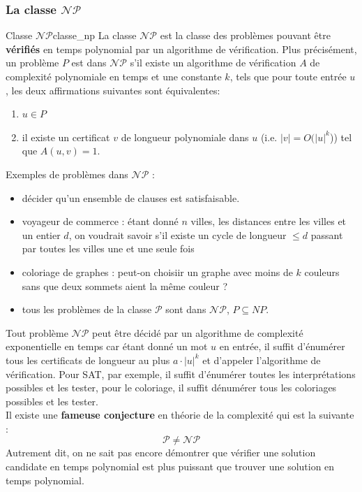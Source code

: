 \subsubsection{La classe $\mathcal{NP}$}
\label{sub:la_classe_np}
\begin{definition}{Classe $\mathcal{NP}$}{classe_np}
    La classe $\mathcal{NP}$ est la classe des problèmes pouvant être \textbf{vérifiés} en temps polynomial par un algorithme de vérification.
    Plus précisément, un problème $P$ est dans $\mathcal{NP}$ s'il existe un algorithme de vérification $A$ de complexité polynomiale en temps
    et une constante $k$, tels que pour toute entrée $u$, les deux affirmations suivantes sont équivalentes:
    \begin{enumerate}
        \item $u\in P$
        \item il existe un certificat $v$ de longueur polynomiale dans $u$ (i.e. $|v| = O(|u|^k$)) tel que $A(u,v)=1$.
    \end{enumerate}
\end{definition}
\begin{example}
    Exemples de problèmes dans $\mathcal{NP}$ :
    \begin{itemize}[label=\textbullet]
        \item décider qu'un ensemble de clauses est satisfaisable.
        \item voyageur de commerce : étant donné $n$ villes, les distances entre les villes et un entier $d$, on voudrait
        savoir s'il existe un cycle de longueur $\leq d$ passant par toutes les villes une et une seule fois
        \item coloriage de graphes : peut-on choisiir un graphe avec moins de $k$ couleurs sans que deux sommets aient la 
        même couleur ?
        \item tous les problèmes de la classe $\mathcal{P}$ sont dans $\mathcal{NP}$, $P\subseteq NP$.
    \end{itemize}
\end{example}
\begin{remark}
    Tout problème $\mathcal{NP}$ peut être décidé par un algorithme de complexité exponentielle en temps car étant donné un mot
    $u$ en entrée, il suffit d'énumérer tous les certificats de longueur au plus $a\cdot|u|^k$ et d'appeler l'algorithme de 
    vérification. Pour SAT, par exemple, il suffit d'énumérer toutes les interprétations possibles et les tester, pour le coloriage,
    il suffit dénumérer tous les coloriages possibles et les tester.\\
    Il existe une \textbf{fameuse conjecture} en théorie de la complexité qui est la suivante : 
    \begin{equation*}
        \mathcal{P}\neq\mathcal{NP}
    \end{equation*}
    Autrement dit, on ne sait pas encore démontrer que vérifier une solution candidate en temps polynomial est plus puissant que
    trouver une solution en temps polynomial.
\end{remark}

